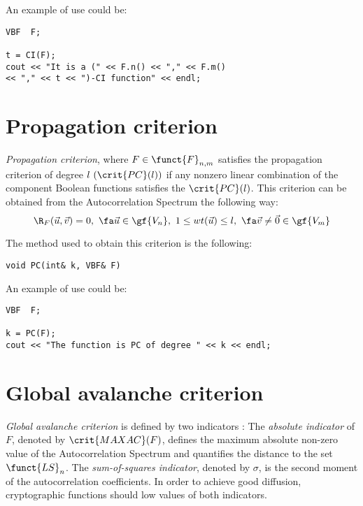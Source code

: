An example of use could be:

\begin{verbatim}
VBF  F;

t = CI(F);
cout << "It is a (" << F.n() << "," << F.m() 
<< "," << t << ")-CI function" << endl;
\end{verbatim}

\section{Propagation criterion}

\textsl{Propagation criterion}, where $F \in \funct{F}_{n,m}$ satisfies
  the propagation criterion of degree $l \ (\crit{PC}(l))$ if any nonzero linear
  combination of the component Boolean functions satisfies the $\crit{PC}(l)$. This
  criterion can be obtained from the Autocorrelation Spectrum the following
  way: 
\begin{equation}
\R_F(\vec{u},\vec{v})=0, \ \fa \vec{u} \in \gf{V_n}, \ 1 \leq wt(\vec{u}) \leq l, \ \fa \vec{v} \neq \vec{0} \in \gf{V_m}
\end{equation}

The method used to obtain this criterion is the following:

\begin{verbatim}
void PC(int& k, VBF& F)
\end{verbatim}

An example of use could be:

\begin{verbatim}
VBF  F;

k = PC(F);
cout << "The function is PC of degree " << k << endl;
\end{verbatim}

\section{Global avalanche criterion}

\textsl{Global avalanche criterion} is defined by two indicators
  \cite{zhang95gac}: The \textsl{absolute indicator} of $F$,
  denoted by $\crit{MAXAC}(F)$, defines the maximum absolute
  non-zero value of the Autocorrelation Spectrum and
    quantifies the distance to the set $\funct{LS}_n$. The
  \textsl{sum-of-squares indicator}, denoted by 
  $\sigma$, is the second moment of the autocorrelation
  coefficients. In order to achieve good diffusion,  
cryptographic functions should low values of both indicators.

